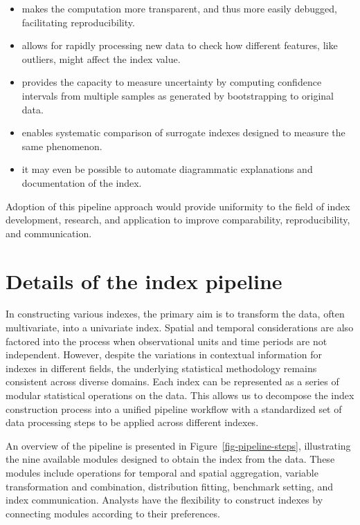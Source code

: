 \documentclass[
]{interact}
\providecommand{\tightlist}{%
  \setlength{\itemsep}{0pt}\setlength{\parskip}{0pt}}\usepackage{longtable,booktabs,array}
\begin{document}
\begin{itemize}
\tightlist
\item
  makes the computation more transparent, and thus more easily debugged,
  facilitating reproducibility.
\item
  allows for rapidly processing new data to check how different
  features, like outliers, might affect the index value.
\item
  provides the capacity to measure uncertainty by computing confidence
  intervals from multiple samples as generated by bootstrapping to
  original data.
\item
  enables systematic comparison of surrogate indexes designed to measure
  the same phenomenon.
\item
  it may even be possible to automate diagrammatic explanations and
  documentation of the index.
\end{itemize}

Adoption of this pipeline approach would provide uniformity to the field
of index development, research, and application to improve
comparability, reproducibility, and communication.

\section{Details of the index pipeline}\label{sec-pipeline}

In constructing various indexes, the primary aim is to transform the
data, often multivariate, into a univariate index. Spatial and temporal
considerations are also factored into the process when observational
units and time periods are not independent. However, despite the
variations in contextual information for indexes in different fields,
the underlying statistical methodology remains consistent across diverse
domains. Each index can be represented as a series of modular
statistical operations on the data. This allows us to decompose the
index construction process into a unified pipeline workflow with a
standardized set of data processing steps to be applied across different
indexes.

An overview of the pipeline is presented in
Figure~\ref{fig-pipeline-steps}, illustrating the nine available modules
designed to obtain the index from the data. These modules include
operations for temporal and spatial aggregation, variable transformation
and combination, distribution fitting, benchmark setting, and index
communication. Analysts have the flexibility to construct indexes by
connecting modules according to their preferences.
\end{document}
